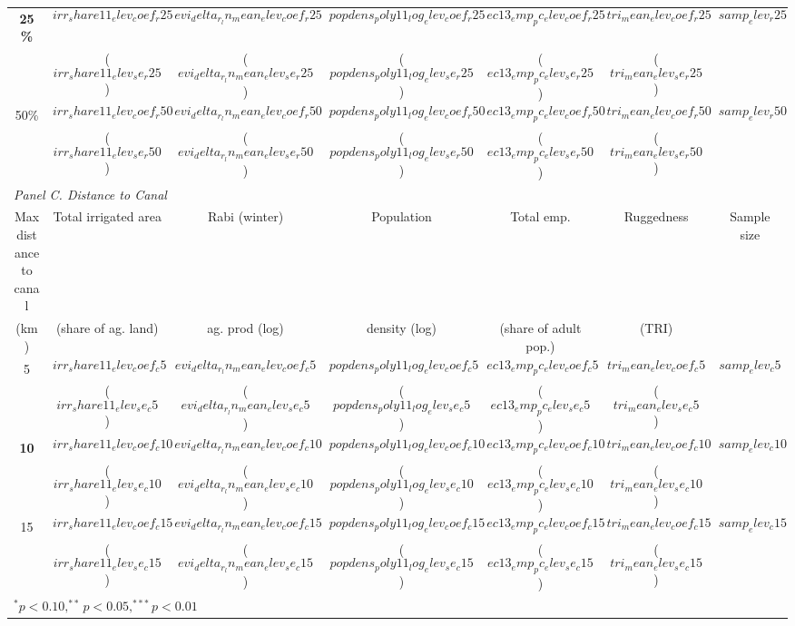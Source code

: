 {\begin{tabular}{c|cccc|c|c}
    \textbf{25\%} & $$irr_share11_elev_coef_r25$$  & $$evi_delta_r_ln_mean_elev_coef_r25$$  & $$popdens_poly11_log_elev_coef_r25$$ & $$ec13_emp_pc_elev_coef_r25$$ & $$tri_mean_elev_coef_r25$$ & $$samp_elev_r25$$\\
    &  ($$irr_share11_elev_se_r25$$)  & ($$evi_delta_r_ln_mean_elev_se_r25$$)  & ($$popdens_poly11_log_elev_se_r25$$) & ($$ec13_emp_pc_elev_se_r25$$) & ($$tri_mean_elev_se_r25$$) &\\  
    
    50\% & $$irr_share11_elev_coef_r50$$  & $$evi_delta_r_ln_mean_elev_coef_r50$$  & $$popdens_poly11_log_elev_coef_r50$$ & $$ec13_emp_pc_elev_coef_r50$$ & $$tri_mean_elev_coef_r50$$ & $$samp_elev_r50$$\\
    &  ($$irr_share11_elev_se_r50$$)  & ($$evi_delta_r_ln_mean_elev_se_r50$$)  & ($$popdens_poly11_log_elev_se_r50$$) & ($$ec13_emp_pc_elev_se_r50$$) & ($$tri_mean_elev_se_r50$$) & \\

    \multicolumn{7}{l}{\textit{Panel C. Distance to Canal}} \\
    \hline\hline
    Max distance to canal & Total irrigated area & Rabi (winter) & Population & Total emp. & Ruggedness & Sample size \\
    (km) & (share of ag. land) & ag. prod (log) & density (log) & (share of adult pop.) & (TRI) & \\
    \hline
       5 & $$irr_share11_elev_coef_c5$$  & $$evi_delta_r_ln_mean_elev_coef_c5$$  & $$popdens_poly11_log_elev_coef_c5$$ & $$ec13_emp_pc_elev_coef_c5$$ & $$tri_mean_elev_coef_c5$$ & $$samp_elev_c5$$\\
    &  ($$irr_share11_elev_se_c5$$)  & ($$evi_delta_r_ln_mean_elev_se_c5$$)  & ($$popdens_poly11_log_elev_se_c5$$) & ($$ec13_emp_pc_elev_se_c5$$) & ($$tri_mean_elev_se_c5$$) &\\
    
    \textbf{10} & $$irr_share11_elev_coef_c10$$  & $$evi_delta_r_ln_mean_elev_coef_c10$$  & $$popdens_poly11_log_elev_coef_c10$$ & $$ec13_emp_pc_elev_coef_c10$$ & $$tri_mean_elev_coef_c10$$ & $$samp_elev_c10$$\\
    &  ($$irr_share11_elev_se_c10$$)  & ($$evi_delta_r_ln_mean_elev_se_c10$$)  & ($$popdens_poly11_log_elev_se_c10$$) & ($$ec13_emp_pc_elev_se_c10$$) & ($$tri_mean_elev_se_c10$$) &\\  
    
    15 & $$irr_share11_elev_coef_c15$$  & $$evi_delta_r_ln_mean_elev_coef_c15$$  & $$popdens_poly11_log_elev_coef_c15$$ & $$ec13_emp_pc_elev_coef_c15$$ & $$tri_mean_elev_coef_c15$$ & $$samp_elev_c15$$\\
    &  ($$irr_share11_elev_se_c15$$)  & ($$evi_delta_r_ln_mean_elev_se_c15$$)  & ($$popdens_poly11_log_elev_se_c15$$) & ($$ec13_emp_pc_elev_se_c15$$) & ($$tri_mean_elev_se_c15$$) & \\
    \hline
    \multicolumn{7}{l}{$^{*}p<0.10, ^{**}p<0.05, ^{***}p<0.01$}
  \end{tabular}
}
